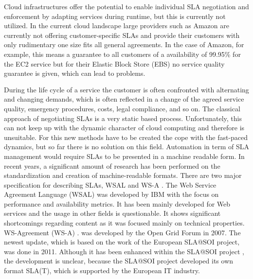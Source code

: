 Cloud infrastructures offer the potential to enable individual SLA negotiation and enforcement by adapting services during runtime, but this is currently not utilized. In the current cloud landscape large providers such as Amazon are currently not offering customer-specific SLAs and provide their customers with only rudimentary one size fits all general agreements. In the case of Amazon, for example, this means a guarantee to all customers of a availability of 99.95\% for the EC2 service but for their Elastic Block Store (EBS) no service quality guarantee is given, which can lead to problems. 

During the life cycle of a service the customer is often confronted with alternating and changing demands, which is often reflected in a change of the agreed service quality, emergency procedures, costs, legal compliance, and so on. The classical approach of negotiating SLAs is a very static based process. Unfortunately, this can not keep up with the dynamic character of cloud computing and therefore is unsuitable. For this new methods have to be created the cope with the fast-paced dynamics, but so far there is no solution on this field. Automation in term  of SLA management would require SLAs to be presented in a machine readable form. In recent years, a significant amount of research has been performed on the standardization and creation of machine-readable formats. There are two major specification for describing SLAs, WSAL \cite{Ludwig03WSLA} and WS-A \cite{Kearney2011b}.  The Web Service Agreement Language (WSAL) \cite{Ludwig03WSLA} was developed by IBM with the focus on performance and availability metrics. It has been mainly developed for Web services and the usage in other fields is questionable. It shows significant shortcomings regarding content as it was focused mainly on technical properties. WS-Agreement (WS-A) \cite{Kearney2011b}.  was developed by the Open Grid Forum in 2007. The newest update, which is based on the work of the European SLA@SOI project, was done in 2011. Although it has been enhanced within the SLA@SOI project \cite{slasoi2011}, the development is unclear, because the SLA@SOI project developed its own format SLA(T), which is supported by the European IT industry.

